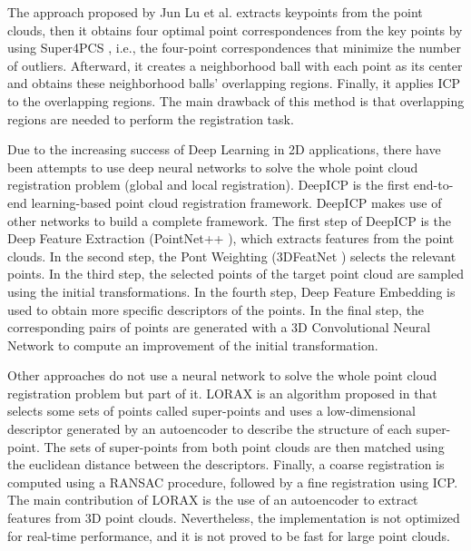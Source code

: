         The approach proposed by Jun Lu et al. \cite{Lu_2019_4pcsicp} extracts keypoints from the point clouds, 
        then it obtains four optimal point correspondences from the key points by using Super4PCS \cite{Mellado_2014_super4pcs},
        i.e., the four-point correspondences that minimize the number of outliers. 
        Afterward, it creates a neighborhood ball with each point as its center and obtains these neighborhood balls’ overlapping regions. 
        Finally, it applies ICP to the overlapping regions. 
        The main drawback of this method is that overlapping regions are needed to perform the registration task.

        Due to the increasing success of Deep Learning in 2D applications, there have been attempts to use deep neural networks
        to solve the whole point cloud registration problem (global and local registration).
        DeepICP \cite{Lu_2019_deepicp} is the first end-to-end learning-based point cloud registration framework.
        DeepICP makes use of other networks to build a complete framework.
        The first step of DeepICP is the Deep Feature Extraction (PointNet++ \cite{Qi_2017_pointnet}), which extracts features from the point clouds.
        In the second step, the Pont Weighting (3DFeatNet \cite{Yew_2018_3dfeat}) selects the relevant points.
        In the third step, the selected points of the target point cloud are sampled using the initial transformations.
        In the fourth step, Deep Feature Embedding is used to obtain more specific descriptors of the points.
        In the final step, the corresponding pairs of points are generated with a 3D Convolutional Neural Network
        to compute an improvement of the initial transformation.
        
        Other approaches do not use a neural network to solve the whole point cloud registration problem but part of it.
        LORAX is an algorithm proposed in \cite{Elbaz_2017_3dpoint} that selects some sets of points called super-points and uses a low-dimensional descriptor 
        generated by an autoencoder to describe the structure of each super-point.
        The sets of super-points from both point clouds are then matched using the euclidean distance between the descriptors.
        Finally, a coarse registration is computed using a RANSAC procedure, followed by a fine registration using ICP.
        The main contribution of LORAX is the use of an autoencoder to extract features from 3D point clouds. 
        Nevertheless, the implementation is not optimized for real-time performance, and it is not proved to be fast for large point clouds.

